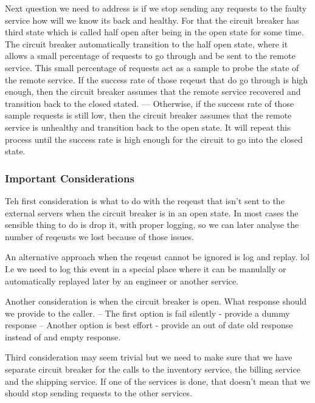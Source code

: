 \documentclass[a4paper, 11pt]{book}
\begin{document}
    Next question we need to address is if we stop sending any requests to the faulty service how will we know its back and healthy.
    For that the circuit breaker has third state which is called half open after being in the open state for some time.
    The circuit breaker automatically transition to the half open state, where it allows a small percentage of requests to go through and be sent to the remote service.
    This small percentage of requests act as a sample to probe the state of the remote service.
    If the success rate of those reqeust that do go through is high enough, then the circuit breaker assumes that the remote service recovered and transition back to the closed stated.
    --- Otherwise, if the success rate of those sample requests is still low, then the circuit breaker assumes that the remote service is unhealthy and transition back to the open state.
    It will repeat this process until the success rate is high enough for the circuit to go into the closed state.

    \subsubsection{Important Considerations}
    Teh first consideration is what to do with the reqeust that isn't sent to the external servers when the circuit breaker is in an open state.
    In most cases the sensible thing to do is drop it, with proper logging, so we can later analyse the number of reqeusts we lost because of those issues.

    An alternative approach when the reqeust cannot be ignored is log and replay. lol
    I.e we need to log this event in a special place where it can be manulally or automatically replayed later by an engineer or another service.

    Another consideration is when the circuit breaker is open.
    What response should we provide to the caller.
    -- The first option is fail silently - provide a dummy response
    -- Another option is best effort - provide an out of date old response instead of and empty response.

    Third consideration may seem trivial but we need to make sure that we have separate circuit breaker for the calls to the inventory service, the billing service and the shipping service.
    If one of the services is done, that doesn't mean that we should stop sending requests to the other services.
\end{document}
